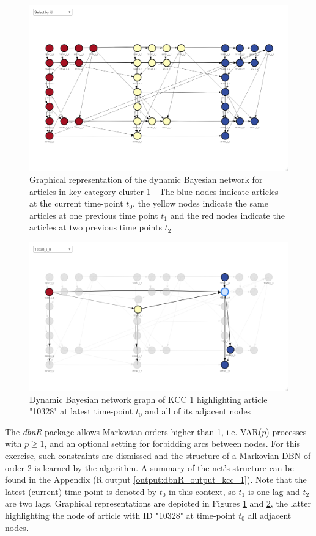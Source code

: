 \begin{figure}[H]
\centering
  \includegraphics[width=0.95\linewidth]{figures/dbn_kcc_1_all.png}
  \caption{Graphical representation of the dynamic Bayesian network for articles in key category cluster 1 - The blue nodes indicate articles at the current time-point $t_0$, the yellow nodes indicate the same articles at one previous time point $t_1$ and the red nodes indicate the articles at two previous time points $t_2$}
  \label{fig:dbn_kcc_1_all}
\end{figure}




\begin{figure}[H]
\centering
  \includegraphics[width=0.95\linewidth]{figures/dbn_kcc_1_article_10328_t_0.png}
  \caption{Dynamic Bayesian network graph of KCC 1 highlighting article "10328" at latest time-point $t_0$ and all of its adjacent nodes}
  \label{fig:dbn_kcc_1_article_10328_t_0}
\end{figure}



The \textit{dbnR} package allows Markovian orders higher than 1, i.e. \ac{VAR}($p$) processes with $p \geq 1$, and an optional setting for forbidding arcs between nodes. For this exercise, such constraints are dismissed and the structure of a Markovian \ac{DBN} of order 2 is learned by the algorithm. A summary of the net's structure can be found in the Appendix (R output \ref{output:dbnR_output_kcc_1}). Note that the latest (current) time-point is denoted by $t_0$ in this context, so $t_1$ is one lag and $t_2$ are two lags. Graphical representations are depicted in Figures \ref{fig:dbn_kcc_1_all} and \ref{fig:dbn_kcc_1_article_10328_t_0}, the latter highlighting the node of article with ID "10328" at time-point $t_0$ all adjacent nodes.
\\

